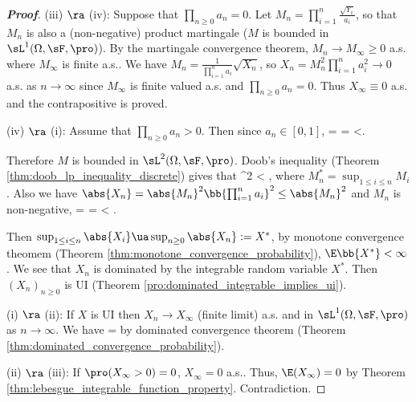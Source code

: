 \begin{proof}[\bf Proof]
(iii) $\ra$ (iv): Suppose that $\prod_{n\geq 0} a_n = 0$. Let $M_n = \prod^n_{i=1} \frac{\sqrt{Y_i}}{a_i}$, so that $M_n$ is also a (non-negative) product martingale ($M$ is bounded in $\sL^1(\Omega,\sF,\pro)$). By the martingale convergence theorem, $M_n \to  M_\infty \geq 0$ a.s. where $M_\infty$ is finite a.s.. We have $M_n = \frac 1{\prod^n_{i=1} a_i }\sqrt{X_n}$, so $X_n = M^2_n \prod^n_{i=1} a^2_i \to 0$ a.s. as $n \to \infty$ since $M_\infty$ is finite valued a.s. and $\prod_{n \geq0} a_n = 0$. Thus $X_\infty \equiv 0$ a.s. and the contrapositive is proved.

(iv) $\ra$ (i): Assume that $\prod_{n\geq0} a_n > 0$. Then since $a_n \in [0,1]$,
\be
\E{} = \E{} =  \leq {} <\infty.
\ee

Therefore $M$ is bounded in $\sL^2(\Omega,\sF,\pro)$. Doob's inequality (Theorem \ref{thm:doob_lp_inequality_discrete}) gives that
\be
\E{} \leq {}^2 \E{} \leq {} < \infty,
\ee
where $M^*_n = \sup_{1\leq i\leq n} M_i$. Also we have $\abs{X_n} = \abs{M_n}^2 \bb{\prod^n_{i=1}a_i}^2 \leq \abs{M_n}^2$ and $M_n$ is non-negative,
\be
\E {} \leq \E {} = \E {} = \E{}  < \infty.
\ee

Then $\sup_{1\leq i\leq n}\abs{X_i} \ua \sup_{n\geq 0}\abs{X_n} := X^*$, by monotone convergence theomem (Theorem \ref{thm:monotone_convergence_probability}), $\E\bb{X^*} < \infty$.
We see that $X_n$ is dominated by the integrable random variable $X^*$. Then  $(X_n)_{n \geq 0}$ is UI (Theorem \ref{pro:dominated_integrable_implies_ui}).

(i) $\ra$ (ii): If $X$ is UI then $X_n \to  X_\infty$ (finite limit) a.s. and in $\sL^1(\Omega,\sF,\pro)$ as $n \to \infty$. We have
 = \E{}\to \E{}
\ee
by dominated convergence theorem (Theorem \ref{thm:dominated_convergence_probability}).

(ii) $\ra$ (iii): If $\pro(X_\infty >0) = 0$, $X_\infty = 0$ a.s.. Thus, $\E(X_\infty)= 0$ by Theorem \ref{thm:lebesgue_integrable_function_property}. Contradiction. %
\end{proof}

